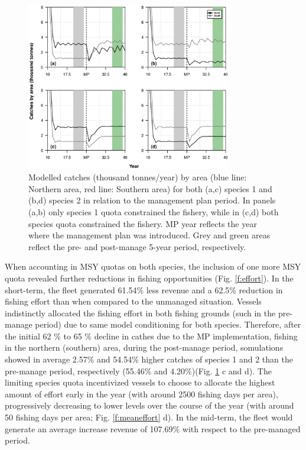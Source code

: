 \documentclass[12pt,oneline,a4paper,numbib]{ouparticle}
\numberwithin{equation}{subsection} %
\begin{document}
\begin{figure}[!ht]
\centering
\includegraphics[width=0.8\textwidth]{Figures/Catchesbyarea.eps} 
\caption{Modelled catches (thousand tonnes/year) by area (blue line: Northern area, red line: Southern area) for both (a,c) species 1 and (b,d) species 2 in relation to the management plan period. In panels (a,b) only species 1 quota constrained the fishery, while in (c,d) both species quota constrained the fishery. MP year reflects the year where the management plan was introduced. Grey and green areas reflect the pre- and post-manage 5-year period, respectively.}
\label{f:catchesbyarea}
\end{figure} 

When accounting in MSY quotas on both species, the inclusion of one more MSY quota revealed further reductions in fishing opportunities (Fig. \ref{f:effort}). In the short-term, the fleet generated 61.54\% less revenue and a 62.5\% reduction in fishing effort than when compared to the unmanaged situation. Vessels indistinctly allocated the fishing effort in both fishing grounds (such in the pre-manage period) due to same model conditioning for both species. Therefore, after the initial 62 \% to 65 \% decline in cathes due to the MP implementation, fishing in the northern (southern) area, during the post-manage period, somulations showed in average 2.57\% and 54.54\% higher catches of species 1 and 2 than the pre-manage period, respectively (55.46\% and 4.20\%)(Fig. \ref{f:catchesbyarea} c and d). The limiting species quota incentivized vessels to choose to allocate the highest amount of effort early in the year (with around 2500 fishing days per area), progressively decreasing to lower levels over the course of the year (with around 50 fishing days per area; Fig. \ref{f:meaneffort} d). In the mid-term, the fleet would generate an average increase revenue of 107.69\% with respect to the pre-managed period. 
\end{document}
